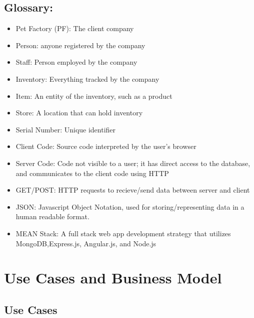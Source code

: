 \documentclass[letterpaper, 12pt]{article}
\begin{document}
\subsection{Glossary:}
%
%
\begin{itemize}
\item Pet Factory (PF): The client company
\item Person: anyone registered by the company
\item Staff: Person employed by the company
\item Inventory: Everything tracked by the company
\item Item: An entity of the inventory, such as a product
\item Store: A location that can hold inventory
\item Serial Number: Unique identifier
\item Client Code: Source code interpreted by the user's browser
\item Server Code: Code not visible to a user; it has direct access to the database, and communicates to the client code using HTTP
\item GET/POST: HTTP requests to recieve/send data between server and client
\item JSON: Javascript Object Notation, used for storing/representing data in a human readable format.
\item MEAN Stack: A full stack web app development strategy that utilizes MongoDB,Express.js, Angular.js, and Node.js

\end{itemize}

\section{Use Cases and Business Model}

\subsection{Use Cases}
\end{document}
